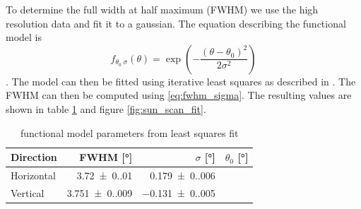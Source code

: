 To determine the full width at half maximum (FWHM) we use the high resolution data and fit it to a gaussian.
The equation describing the functional model is
\begin{equation}
    f_{\theta_0\;\sigma}(\theta) = \exp{\left(-\frac{(\theta-\theta_0)^2}{2\sigma^2}\right)}
\end{equation}.
The model can then be fitted using iterative least squares as described in \cite{ghilani_adjustment_2006}. The FWHM can then be computed using \eqref{eq:fwhm_sigma}.
The resulting values are shown in table \ref{tab:params} and figure \ref{fig:sun_scan_fit}.
\begin{table}[H]
    \centering
    \begin{tabular}{lrrr}
        \toprule
        Direction & FWHM [\si{\degree}]& $ \sigma$ [\si{\degree}] & $ \theta_0 $ [\si{\degree}]\\
        \midrule
        Horizontal & \SI{3.72(0.01)}{} & \SI{0.179(0.006)}{}\\
        Vertical & \SI{3.751(0.009)}{} & \SI{-0.131(0.005)}{}\\
        \bottomrule
    \end{tabular}
    \caption{functional model parameters from least squares fit}
    \label{tab:params}
\end{table}
